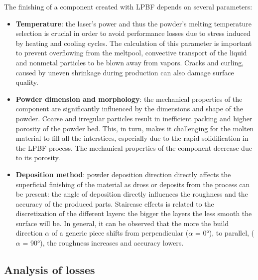 The finishing of a component created with LPBF depends on several parameters: 

\begin{itemize}
    \item \textbf{Temperature}: the laser's power and thus the powder's melting temperature selection is crucial in order to avoid performance losses due to stress induced by heating and cooling cycles. The calculation of this parameter is important to prevent overflowing from the meltpool, convective transport of the liquid and nonmetal particles to be blown away from vapors. Cracks and curling, caused by uneven shrinkage during production can also damage surface quality\cite{lpbf_accuracy}. 
    \item  \textbf{Powder dimension and morphology}: the mechanical properties of the component are significantly influenced by the dimensions and shape of the powder. Coarse and irregular particles result in inefficient packing and higher porosity of the powder bed. This, in turn, makes it challenging for the molten material to fill all the interstices, especially due to the rapid solidification in the LPBF process. The mechanical properties of the component decrease due to its porosity\cite{dimension_powder}.
    \item  \textbf{Deposition method}: powder deposition direction directly affects the superficial finishing of the material as dross or deposits from the process can be present: the angle of deposition directly influences the roughness and the accuracy of the produced parts. Staircase effects is related to the discretization of the different layers: the bigger the layers the less smooth the surface will be. In general, it can be observed that the more the build direction $\alpha$ of a generic piece shifts from perpendicular ($\alpha$ = 0°), to parallel, ($\alpha$ = 90°), the roughness increases and accuracy lowers\cite{tesi_dottorato}.
\end{itemize}


\subsection{Analysis of losses}
\label{subsec:losses_intro}

